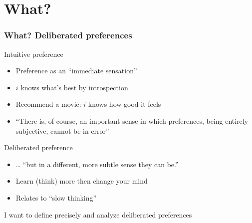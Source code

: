 \documentclass[french,english]{beamer}
\begin{document}
\section{What?}
\begin{frame}
	\frametitle{What? Deliberated preferences}
	\begin{block}{Intuitive preference}
		\begin{itemize}
			\item Preference as an “immediate sensation” \citep{von_neumann_theory_1944}
			\item $i$ knows what’s best by introspection
			\item Recommend a movie: $i$ knows how good it feels
			\item “There is, of course, an important sense in which preferences, being entirely subjective, cannot be in error” \citep{savage_foundations_1972}
		\end{itemize}
	\end{block}
	\begin{block}{Deliberated preference}
		\begin{itemize}
			\item … “but in a different, more subtle sense they can be.”
			\item Learn (think) more then change your mind
			\item Relates to “slow thinking” \citep{kahneman_thinking_2013}
		\end{itemize}
	\end{block}
	I want to define precisely and analyze deliberated preferences
\end{frame}
\end{document}
